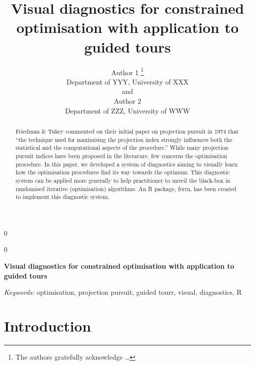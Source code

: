 \documentclass[12pt]{article}
\newcommand{\blind}{0}
\begin{document}
\def\spacingset#1{\renewcommand{\baselinestretch}%
{#1}\small\normalsize} \spacingset{1}



\blind
{
  \title{\bf Visual diagnostics for constrained optimisation with application to guided tours}

  \author{
        Author 1 \thanks{The authors gratefully acknowledge \ldots{}} \\
    Department of YYY, University of XXX\\
     and \\     Author 2 \\
    Department of ZZZ, University of WWW\\
      }
  \maketitle
} \fi

\blind
{
  \bigskip
  \bigskip
  \bigskip
  \begin{center}
    {\LARGE\bf Visual diagnostics for constrained optimisation with application to guided tours}
  \end{center}
  \medskip
} \fi

\bigskip
\begin{abstract}
Friedman \& Tukey commented on their initial paper on projection pursuit in 1974 that ``the technique used for maximising the projection index strongly influences both the statistical and the computational aspects of the procedure.'' While many projection pursuit indices have been proposed in the literature, few concerns the optimisation procedure. In this paper, we developed a system of diagnostics aiming to visually learn how the optimisation procedures find its way towards the optimum. This diagnostic system can be applied more generally to help practitioner to unveil the black-box in randomised iterative (optimisation) algorithms. An R package, ferrn, has been created to implement this diagnostic system.
\end{abstract}

\noindent%
{\it Keywords:} optimisation, projection pursuit, guided tourr, visual, diagnostics, R
\vfill

\newpage
\spacingset{1.45} %

\hypertarget{introduction}{%
\section{Introduction}\label{introduction}}
\end{document}
